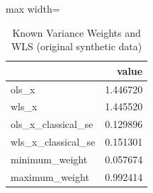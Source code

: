 \begin{table}[htbp]
\centering
\caption{Known Variance Weights and WLS (original synthetic data)}
\begingroup
\small
\setlength{\tabcolsep}{6pt}
\renewcommand{\arraystretch}{1.12}
\begin{adjustbox}{max width=\linewidth}
\begin{tabular}{@{}lr@{}}
\toprule
 & value \\
\midrule
ols\_x & 1.446720 \\
wls\_x & 1.445520 \\
ols\_x\_classical\_se & 0.129896 \\
wls\_x\_classical\_se & 0.151301 \\
minimum\_weight & 0.057674 \\
maximum\_weight & 0.992414 \\
\bottomrule
\end{tabular}
\end{adjustbox}
\endgroup
\end{table}